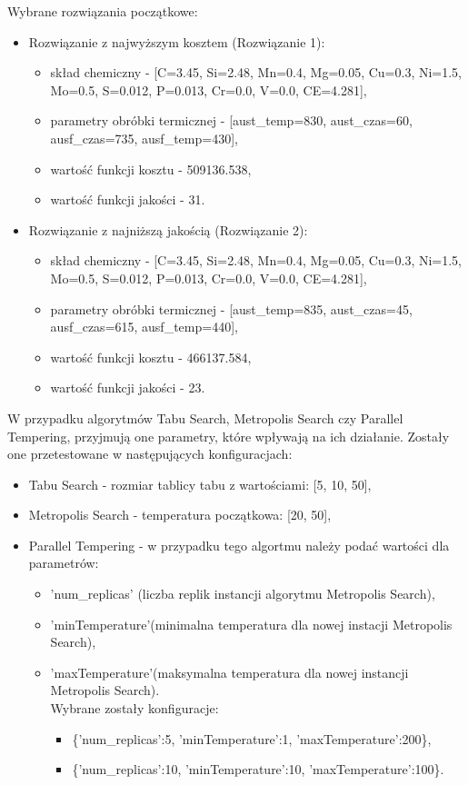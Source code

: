 Wybrane rozwiązania początkowe: 
\begin{itemize}
    \item Rozwiązanie z najwyższym kosztem (Rozwiązanie 1):
    \begin{itemize}
        \item skład chemiczny - [C=3.45, Si=2.48, Mn=0.4, Mg=0.05, Cu=0.3, Ni=1.5, Mo=0.5, S=0.012, P=0.013, Cr=0.0, V=0.0, CE=4.281],
        \item parametry obróbki termicznej - [aust\_temp=830, aust\_czas=60, ausf\_czas=735, ausf\_temp=430],
        \item wartość funkcji kosztu - 509136.538,
        \item wartość funkcji jakości - 31.
    \end{itemize}
    \item Rozwiązanie z najniższą jakością (Rozwiązanie 2):
    \begin{itemize}
        \item skład chemiczny - [C=3.45, Si=2.48, Mn=0.4, Mg=0.05, Cu=0.3, Ni=1.5, Mo=0.5, S=0.012, P=0.013, Cr=0.0, V=0.0, CE=4.281],
        \item parametry obróbki termicznej - [aust\_temp=835, aust\_czas=45, ausf\_czas=615, ausf\_temp=440],
        \item wartość funkcji kosztu - 466137.584,
        \item wartość funkcji jakości - 23.
    \end{itemize}
\end{itemize}

W przypadku algorytmów Tabu Search, Metropolis Search czy Parallel Tempering, przyjmują one parametry, które wpływają na ich działanie. Zostały one przetestowane w następujących konfiguracjach:
\begin{itemize}
    \item Tabu Search - rozmiar tablicy tabu z wartościami: [5, 10, 50],
    \item Metropolis Search - temperatura początkowa: [20, 50],
    \item Parallel Tempering - w przypadku tego algortmu należy podać wartości dla parametrów:
    \begin{itemize}
        \item 'num\_replicas' (liczba replik instancji algorytmu Metropolis Search),
        \item 'minTemperature'(minimalna temperatura dla nowej instacji Metropolis Search),
        \item 'maxTemperature'(maksymalna temperatura dla nowej instancji Metropolis Search).\\
        Wybrane zostały konfiguracje: 
        \begin{itemize}
            \item \{'num\_replicas':5,  'minTemperature':1, 'maxTemperature':200\},
            \item \{'num\_replicas':10,  'minTemperature':10, 'maxTemperature':100\}.
        \end{itemize}
    \end{itemize}  
\end{itemize}


